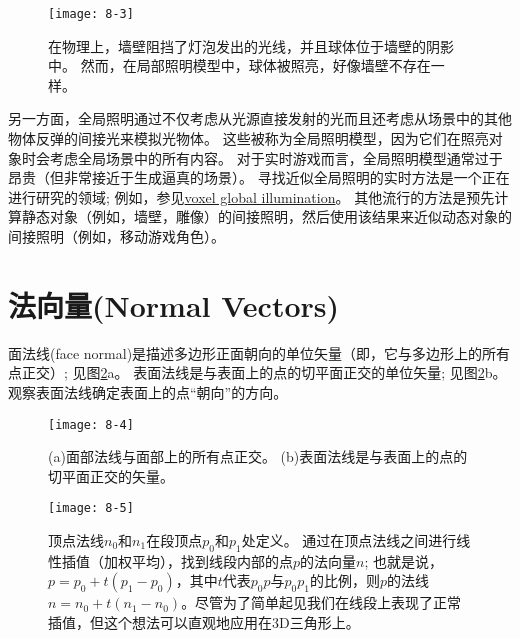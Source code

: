 \begin{figure}[h]
    \label{fig:8-3}
    \texttt{[image: 8-3]}
    \centering
    \caption{在物理上，墙壁阻挡了灯泡发出的光线，并且球体位于墙壁的阴影中。 然而，在局部照明模型中，球体被照亮，好像墙壁不存在一样。}
\end{figure}

\begin{flushleft}
另一方面，全局照明通过不仅考虑从光源直接发射的光而且还考虑从场景中的其他物体反弹的间接光来模拟光物体。 这些被称为全局照明模型，因为它们在照亮对象时会考虑全局场景中的所有内容。 对于实时游戏而言，全局照明模型通常过于昂贵（但非常接近于生成逼真的场景）。 寻找近似全局照明的实时方法是一个正在进行研究的领域; 例如，参见\href{http://on-demand.gputechconf.com/gtc/2014/presentations/S4552-rt-voxel-based-global-illumination-gpus.pdf}{\textcolor{linkColor}{voxel global illumination}}。 其他流行的方法是预先计算静态对象（例如，墙壁，雕像）的间接照明，然后使用该结果来近似动态对象的间接照明（例如，移动游戏角色）。\\
\end{flushleft}

\section{法向量(Normal Vectors)}
\begin{flushleft}
面法线(face normal)是描述多边形正面朝向的单位矢量（即，它与多边形上的所有点正交）; 见图\ref{fig:8-4}a。 表面法线是与表面上的点的切平面正交的单位矢量; 见图\ref{fig:8-4}b。 观察表面法线确定表面上的点“朝向”的方向。\\
\end{flushleft}

\begin{figure}[h]
    \label{fig:8-4}
    \texttt{[image: 8-4]}
    \centering
    \caption{(a)面部法线与面部上的所有点正交。 (b)表面法线是与表面上的点的切平面正交的矢量。}
\end{figure}

\begin{figure}[h]
    \label{fig:8-5}
    \texttt{[image: 8-5]}
    \centering
    \caption{顶点法线$n_{0}$和$n_{1}$在段顶点$p_{0}$和$p_{1}$处定义。 通过在顶点法线之间进行线性插值（加权平均），找到线段内部的点$p$的法向量$n$; 也就是说，$p=p_{0}+t(p_{1}-p_{0})$，其中$t$代表$p_{0}p$与$p_{0}p_{1}$的比例，则$p$的法线$n=n_{0} + t(n_{1}-n_{0})$。尽管为了简单起见我们在线段上表现了正常插值，但这个想法可以直观地应用在3D三角形上。}
\end{figure}

